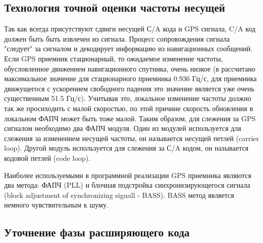 \subsection{Технология точной оценки частоты несущей}
Так как всегда присутствуют сдвиги несущей С/A кода и GPS сигнала, C/A код должен быть быть извлечен из сигнала. Процесс сопровождения 
сигнала "следует" за сигналом и декодирует информацию из навигационных сообщений. Если GPS приемник стационарный, то ожидаемое
изменение частоты, обусловленное движением навигационного спутника, очень низкое (в \cite{tsui} рассчитано максимальное 
значение для стационарного
приемника 0.936 Гц/с, для приемника движущегося с ускорением свободного падения это значение является уже очень существенным 
51.5 Гц/с).
Учитывая это, локальное изменение частоты должно так же просиходить с малой скоростью, по этой причине скорость обновления в
локальном ФАПЧ может быть тоже малой. Таким образом, для слежения за GPS сигналом необходимо два ФАПЧ модуля. Один из модулей
используется для слежения за изменением несущей частоты, он называется несущей петлей (carrier loop). Другой модуль 
используется для слежения за С/A кодом, он называется кодовой петлей (code loop).

Наиболее используемыми в программной реализации GPS приемника являются два метода: ФАПЧ (PLL) и блочная подстройка синхронизирующегося
сигнала (block adjustment of synchronizing signall - BASS). BASS метод является немного чувствительным к шуму.


\subsection{Уточнение фазы расширяющего кода}

\newpage
